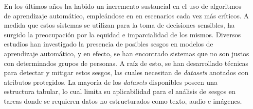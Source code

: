 \begin{resumen}
	

	En los \'ultimos a\~nos ha habido un incremento sustancial en el uso de algoritmos de aprendizaje autom\'atico, emple\'andose en
	en escenarios cada vez m\'as cr\'iticos. A medida que estos sistemas se utilizan para la toma de decisiones sensibles, ha surgido 
	la preocupaci\'on por la equidad e imparcialidad de los mismos. Diversos estudios han investigado la presencia de posibles sesgos
    en modelos de aprendizaje autom\'atico, y en efecto, se han encontrado sistemas que no son justos con determinados grupos de personas.
	A ra\'iz de esto, se han desarrollado t\'ecnicas para detectar y mitigar estos sesgos, las cuales necesitan de \emph{datasets} anotados
	con atributos protegidos. La mayor\'ia de los \emph{datasets} disponibles poseen una estructura tabular, lo cual limita su aplicabilidad
	para el an\'alisis de sesgos en tareas donde se requieren datos no estructurados como texto, audio e im\'agenes.
	

\end{resumen}
